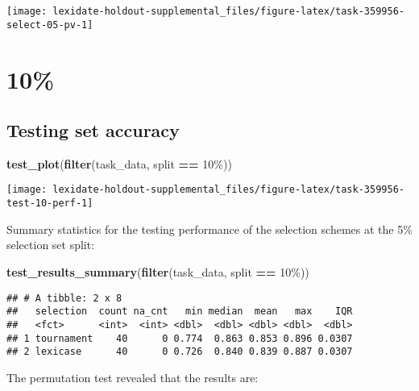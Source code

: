 \documentclass[
]{book}
\newenvironment{Shaded}{\begin{snugshade}}{\end{snugshade}}
\newcommand{\FunctionTok}[1]{\textcolor[rgb]{0.13,0.29,0.53}{\textbf{#1}}}
\newcommand{\NormalTok}[1]{#1}
\newcommand{\SpecialCharTok}[1]{\textcolor[rgb]{0.81,0.36,0.00}{\textbf{#1}}}
\newcommand{\StringTok}[1]{\textcolor[rgb]{0.31,0.60,0.02}{#1}}
\begin{document}
\texttt{[image: lexidate-holdout-supplemental\_files/figure-latex/task-359956-select-05-pv-1]}

\hypertarget{section-26}{%
\section{10\%}\label{section-26}}

\hypertarget{testing-set-accuracy-26}{%
\subsection{Testing set accuracy}\label{testing-set-accuracy-26}}

\begin{Shaded}
\begin{Highlighting}[]
\FunctionTok{test\_plot}\NormalTok{(}\FunctionTok{filter}\NormalTok{(task\_data, split }\SpecialCharTok{==} \StringTok{\textquotesingle{}10\%\textquotesingle{}}\NormalTok{))}
\end{Highlighting}
\end{Shaded}

\texttt{[image: lexidate-holdout-supplemental\_files/figure-latex/task-359956-test-10-perf-1]}

Summary statistics for the testing performance of the selection schemes at the 5\% selection set split:

\begin{Shaded}
\begin{Highlighting}[]
\FunctionTok{test\_results\_summary}\NormalTok{(}\FunctionTok{filter}\NormalTok{(task\_data, split }\SpecialCharTok{==} \StringTok{\textquotesingle{}10\%\textquotesingle{}}\NormalTok{))}
\end{Highlighting}
\end{Shaded}

\begin{verbatim}
## # A tibble: 2 x 8
##   selection  count na_cnt   min median  mean   max    IQR
##   <fct>      <int>  <int> <dbl>  <dbl> <dbl> <dbl>  <dbl>
## 1 tournament    40      0 0.774  0.863 0.853 0.896 0.0307
## 2 lexicase      40      0 0.726  0.840 0.839 0.887 0.0307
\end{verbatim}

The permutation test revealed that the results are:
\end{document}
